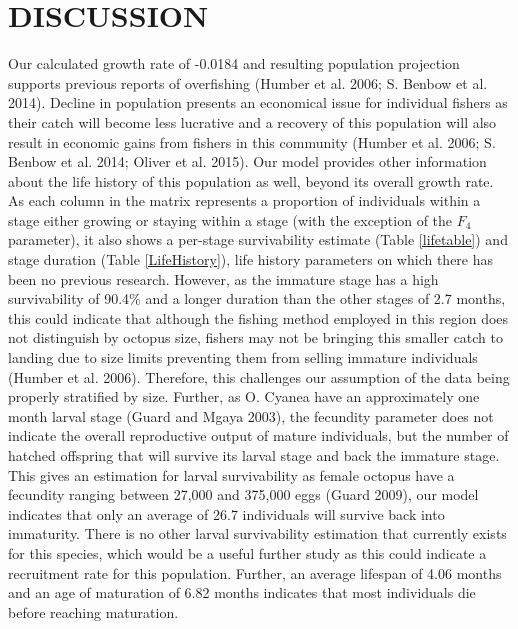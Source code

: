 \documentclass[
]{article}
\begin{document}
\hypertarget{discussion}{%
\section{DISCUSSION}\label{discussion}}

Our calculated growth rate of -0.0184 and resulting population projection supports previous reports of overfishing (Humber et al. 2006; S. Benbow et al. 2014). Decline in population presents an economical issue for individual fishers as their catch will become less lucrative and a recovery of this population will also result in economic gains from fishers in this community (Humber et al. 2006; S. Benbow et al. 2014; Oliver et al. 2015). Our model provides other information about the life history of this population as well, beyond its overall growth rate. As each column in the matrix represents a proportion of individuals within a stage either growing or staying within a stage (with the exception of the \(F_4\) parameter), it also shows a per-stage survivability estimate (Table \ref{lifetable}) and stage duration (Table \ref{LifeHistory}), life history parameters on which there has been no previous research. However, as the immature stage has a high survivability of 90.4\% and a longer duration than the other stages of 2.7 months, this could indicate that although the fishing method employed in this region does not distinguish by octopus size, fishers may not be bringing this smaller catch to landing due to size limits preventing them from selling immature individuals (Humber et al. 2006). Therefore, this challenges our assumption of the data being properly stratified by size. Further, as O. Cyanea have an approximately one month larval stage (Guard and Mgaya 2003), the fecundity parameter does not indicate the overall reproductive output of mature individuals, but the number of hatched offspring that will survive its larval stage and back the immature stage. This gives an estimation for larval survivability as female octopus have a fecundity ranging between 27,000 and 375,000 eggs (Guard 2009), our model indicates that only an average of 26.7 individuals will survive back into immaturity. There is no other larval survivability estimation that currently exists for this species, which would be a useful further study as this could indicate a recruitment rate for this population. Further, an average lifespan of 4.06 months and an age of maturation of 6.82 months indicates that most individuals die before reaching maturation.
\end{document}
